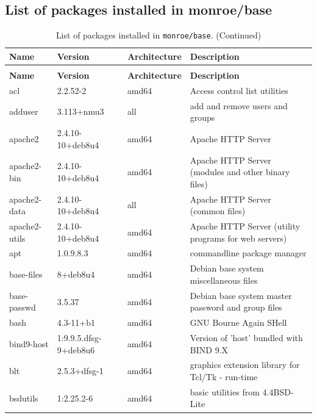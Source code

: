 \documentclass[a4paper,10pt]{article}
\newcommand{\identifier}[1]{{\texttt{\small{#1}}}}
\begin{document}
\begin{appendices}
\section{List of packages installed in monroe/base}
\label{app:installedPackages}

{\scriptsize
\begin{longtable}{p{3.25cm}@{\hspace{0.25cm}}p{4cm}@{\hspace{0.25cm}}l@{\hspace{0.25cm}}p{7cm}}
	\caption{List of packages installed in \identifier{monroe/base}.}\label{tab:installedPackages}\\
	\toprule
	\textbf{Name} & \textbf{Version} & \textbf{Architecture} & \textbf{Description} \\	\midrule
	\endfirsthead
	\caption{List of packages installed in \identifier{monroe/base}. (Continued)}\\
	\toprule
	\textbf{Name} & \textbf{Version} & \textbf{Architecture} & \textbf{Description} \\	\midrule
	\endhead
%
acl	&	2.2.52-2	&	amd64	&	Access control list utilities	\\
adduser	&	3.113+nmu3	&	all	&	add and remove users and groups	\\
apache2	&	2.4.10-10+deb8u4	&	amd64	&	Apache HTTP Server	\\
apache2-bin	&	2.4.10-10+deb8u4	&	amd64	&	Apache HTTP Server (modules and other binary files)	\\
apache2-data	&	2.4.10-10+deb8u4	&	all	&	Apache HTTP Server (common files)	\\
apache2-utils	&	2.4.10-10+deb8u4	&	amd64	&	Apache HTTP Server (utility programs for web servers)	\\
apt	&	1.0.9.8.3	&	amd64	&	commandline package manager	\\
base-files	&	8+deb8u4	&	amd64	&	Debian base system miscellaneous files	\\
base-passwd	&	3.5.37	&	amd64	&	Debian base system master password and group files	\\
bash	&	4.3-11+b1	&	amd64	&	GNU Bourne Again SHell	\\
bind9-host	&	1:9.9.5.dfsg-9+deb8u6	&	amd64	&	Version of 'host' bundled with BIND 9.X	\\
blt	&	2.5.3+dfsg-1	&	amd64	&	graphics extension library for Tcl/Tk - run-time	\\
bsdutils	&	1:2.25.2-6	&	amd64	&	basic utilities from 4.4BSD-Lite	\\

\end{longtable}}
\end{appendices}
\end{document}
